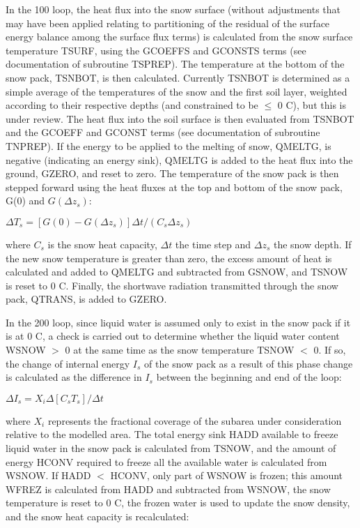 In the 100 loop, the heat flux into the snow surface (without adjustments that may have been applied relating to partitioning of the residual of the surface energy balance among the surface flux terms) is calculated from the snow surface temperature T\+S\+U\+R\+F, using the G\+C\+O\+E\+F\+F\+S and G\+C\+O\+N\+S\+T\+S terms (see documentation of subroutine T\+S\+P\+R\+E\+P). The temperature at the bottom of the snow pack, T\+S\+N\+B\+O\+T, is then calculated. Currently T\+S\+N\+B\+O\+T is determined as a simple average of the temperatures of the snow and the first soil layer, weighted according to their respective depths (and constrained to be $\leq$ 0 C), but this is under review. The heat flux into the soil surface is then evaluated from T\+S\+N\+B\+O\+T and the G\+C\+O\+E\+F\+F and G\+C\+O\+N\+S\+T terms (see documentation of subroutine T\+N\+P\+R\+E\+P). If the energy to be applied to the melting of snow, Q\+M\+E\+L\+T\+G, is negative (indicating an energy sink), Q\+M\+E\+L\+T\+G is added to the heat flux into the ground, G\+Z\+E\+R\+O, and reset to zero. The temperature of the snow pack is then stepped forward using the heat fluxes at the top and bottom of the snow pack, G(0) and $G(\Delta z_s)$\+:

$\Delta T_s = [G(0) - G(\Delta z_s)] \Delta t /(C_s \Delta z_s)$

where $C_s$ is the snow heat capacity, $\Delta t$ the time step and $\Delta z_s$ the snow depth. If the new snow temperature is greater than zero, the excess amount of heat is calculated and added to Q\+M\+E\+L\+T\+G and subtracted from G\+S\+N\+O\+W, and T\+S\+N\+O\+W is reset to 0 C. Finally, the shortwave radiation transmitted through the snow pack, Q\+T\+R\+A\+N\+S, is added to G\+Z\+E\+R\+O.

In the 200 loop, since liquid water is assumed only to exist in the snow pack if it is at 0 C, a check is carried out to determine whether the liquid water content W\+S\+N\+O\+W $>$ 0 at the same time as the snow temperature T\+S\+N\+O\+W $<$ 0. If so, the change of internal energy $I_s$ of the snow pack as a result of this phase change is calculated as the difference in $I_s$ between the beginning and end of the loop\+:

$\Delta I_s = X_i \Delta [C_s T_s]/ \Delta t$

where $X_i$ represents the fractional coverage of the subarea under consideration relative to the modelled area. The total energy sink H\+A\+D\+D available to freeze liquid water in the snow pack is calculated from T\+S\+N\+O\+W, and the amount of energy H\+C\+O\+N\+V required to freeze all the available water is calculated from W\+S\+N\+O\+W. If H\+A\+D\+D $<$ H\+C\+O\+N\+V, only part of W\+S\+N\+O\+W is frozen; this amount W\+F\+R\+E\+Z is calculated from H\+A\+D\+D and subtracted from W\+S\+N\+O\+W, the snow temperature is reset to 0 C, the frozen water is used to update the snow density, and the snow heat capacity is recalculated\+:

